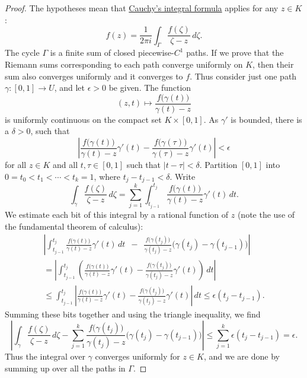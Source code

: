 \documentclass[12pt,openany]{book}
\newcommand{\sabs}[1]{\lvert {#1} \rvert}
\newcommand{\abs}[1]{\left\lvert {#1} \right\rvert}
\theoremstyle{plain}
\theoremstyle{remark}
\theoremstyle{definition}
\theoremstyle{exercise}
\theoremstyle{example}
\begin{document}
\begin{proof}
The hypotheses mean that \hyperref[thm:CIFhomology]{Cauchy's integral formula}
applies for any $z \in K$:
\begin{equation*}
f(z) =
\frac{1}{2\pi i}
\int_\Gamma
\frac{f(\zeta)}{\zeta-z} \, d \zeta .
\end{equation*}
The cycle $\Gamma$ is a finite sum of closed piecewise-$C^1$ paths.
If we prove that the Riemann sums corresponding to each path
converge uniformly on $K$, then their sum also converges uniformly
and it converges to $f$.
Thus consider just one path $\gamma \colon [0,1] \to U$, and
let $\epsilon > 0$ be given.
The function
\begin{equation*}
(z,t) \mapsto
\frac{f\bigl(\gamma(t)\bigr)}{\gamma(t)-z}
\end{equation*}
is uniformly continuous on the compact set $K \times [0,1]$.
As $\gamma'$ is bounded, there is a $\delta > 0$, such that
\begin{equation*}
\abs{
\frac{f\bigl(\gamma(t)\bigr)}{\gamma(t)-z}\gamma'(t)
-
\frac{f\bigl(\gamma(\tau)\bigr)}{\gamma(\tau)-z}\gamma'(t)
} < \epsilon
\end{equation*}
for all $z \in K$ and all $t,\tau \in [0,1]$ such that $\sabs{t-\tau} <
\delta$.
Partition $[0,1]$ into $0 = t_0 < t_1 < \cdots < t_k = 1$, where
$t_j-t_{j-1} < \delta$.
Write
\begin{equation*}
\int_\gamma
\frac{f(\zeta)}{\zeta-z} \, d\zeta
=
\sum_{j=1}^k
\int_{t_{j-1}}^{t_j}
\frac{f\bigl(\gamma(t)\bigr)}{\gamma(t)-z}
\gamma'(t)
\, dt .
\end{equation*}
We estimate each bit of this integral by a rational function
of $z$
(note the use of the fundamental theorem of calculus):
\begin{multline*}
\abs{
\int_{t_{j-1}}^{t_j}
\frac{f\bigl(\gamma(t)\bigr)}{\gamma(t)-z}
\gamma'(t)
\, dt
\enspace
-
\enspace
\frac{f\bigl(\gamma(t_j)\bigr)}{\gamma(t_j)-z}
\bigl( \gamma(t_j)-\gamma(t_{j-1}) \bigr)
}
\\
=
\abs{
\int_{t_{j-1}}^{t_j}
\left(
\frac{f\bigl(\gamma(t)\bigr)}{\gamma(t)-z}
\gamma'(t)
-
\frac{f\bigl(\gamma(t_j)\bigr)}{\gamma(t_j)-z}
\gamma'(t)
\right)
\, dt
}
\\
\leq
\int_{t_{j-1}}^{t_j}
\abs{
\frac{f\bigl(\gamma(t)\bigr)}{\gamma(t)-z}
\gamma'(t)
-
\frac{f\bigl(\gamma(t_j)\bigr)}{\gamma(t_j)-z}
\gamma'(t)
}
\, dt
\leq \epsilon (t_j-t_{j-1}) .
\end{multline*}
Summing these bits together and using the triangle inequality, we find
\begin{equation*}
\abs{
\int_{\gamma} \frac{f(\zeta)}{\zeta-z} \, d\zeta
-
\sum_{j=1}^k
\frac{f\bigl(\gamma(t_j)\bigr)}{\gamma(t_j)-z}
\bigl( \gamma(t_j)-\gamma(t_{j-1}) \bigr)
}
\leq \sum_{j=1}^k \epsilon (t_j-t_{j-1}) = \epsilon .
\end{equation*}
Thus the integral over $\gamma$ converges uniformly for $z \in K$, and
we are done by summing up over all the paths in $\Gamma$.
\end{proof}
\end{document}
